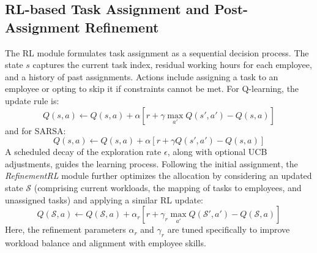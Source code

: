 \documentclass[%
aip,
cp,  %
amsmath,amssymb,
reprint,%
]{revtex4-2}
\begin{document}
	\subsection{\label{subsec:rl-task}RL-based Task Assignment and Post-Assignment Refinement}
	
	The RL module formulates task assignment as a sequential decision process. The state $s$ captures the current task index, residual working hours for each employee, and a history of past assignments. Actions include assigning a task to an employee or opting to skip it if constraints cannot be met. For Q-learning, the update rule is:
	\begin{equation}
		Q(s,a) \leftarrow Q(s,a) + \alpha \left[r + \gamma \max_{a'} Q(s',a') - Q(s,a)\right]
	\end{equation}
	and for SARSA:
	\begin{equation}
		Q(s,a) \leftarrow Q(s,a) + \alpha \left[r + \gamma Q(s',a') - Q(s,a)\right]
	\end{equation}
	A scheduled decay of the exploration rate $\epsilon$, along with optional UCB adjustments, guides the learning process. Following the initial assignment, the \emph{RefinementRL} module further optimizes the allocation by considering an updated state $\mathcal{S}$ (comprising current workloads, the mapping of tasks to employees, and unassigned tasks) and applying a similar RL update:
	\begin{equation}
		Q(\mathcal{S},a) \leftarrow Q(\mathcal{S},a) + \alpha_r \left[r + \gamma_r \max_{a'} Q(\mathcal{S}',a') - Q(\mathcal{S},a)\right]
	\end{equation}
	Here, the refinement parameters $\alpha_r$ and $\gamma_r$ are tuned specifically to improve workload balance and alignment with employee skills.
	
\end{document}

